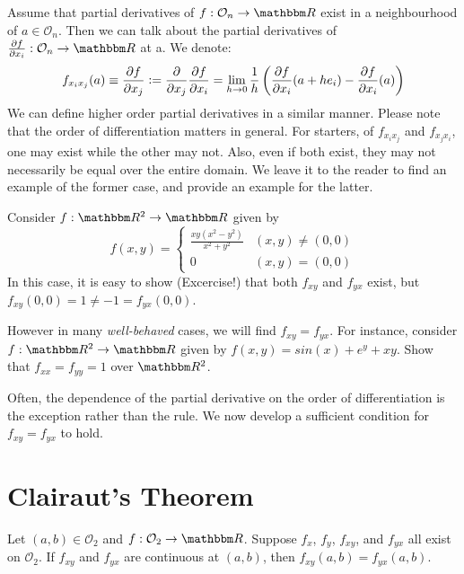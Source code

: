 \documentclass[../Analysis-3]{subfiles}
\begin{document}
Assume that partial derivatives of $f: \mathcal{O}_n \to \R$ exist in a neighbourhood of $a \in \mathcal{O}_n $. Then we can talk about the partial derivatives of $\pdv{f}{x_i}: \mathcal{O}_n \to \R$ at a. We denote:
\[f_{x_i x_j}(a) \equiv \pdv{f}{x_j} \mathrel{\mathop:}= \frac{\partial}{\partial x_j} \pdv{f}{x_i} = \lim_{h \to 0} \frac{1}{h} \left( \pdv{f}{x_i}\/(a+h e_i)- \pdv{f}{x_i}\/ (a) \right) 
\]
We can define higher order partial derivatives in a similar manner. Please note that the order of differentiation matters in general. For starters, of  $f_{x_i x_j}$ and $f_{x_j x_i}$, one may exist while the other may not. Also, even if both exist, they may not necessarily be equal over the entire domain. We leave it to the reader to find an example of the former case, and provide an example for the latter.

\begin{Eg}{}{}
    Consider $f: \R^2 \to \R$ given by 
    \[
        f(x,y) = 
        \begin{cases}
        \frac{xy(x^2 - y^2)}{x^2 + y^2} & (x,y) \neq (0,0)\\
        0 & (x,y) = (0,0)
        \end{cases}
    \]
    In this case, it is easy to show (Excercise!) that both $f_{xy}$ and $f_{yx}$ exist, but $f_{xy}(0,0) = 1 \neq -1 = f_{yx}(0,0)$.
\end{Eg}

\begin{Eg}{}{}
    However in many \emph{well-behaved} cases, we will find $f_{xy} = f_{yx}$.
    For instance, consider $f: \R^2 \to \R$ given by $f(x,y) = sin(x) + e^y + xy$. Show that $f_{xx} = f_{yy} = 1$ over $\R^2$.
\end{Eg}

Often, the dependence of the partial derivative on the order of differentiation is the exception rather than the rule. We now develop a sufficient condition for $f_{xy} = f_{yx}$ to hold.

\section{Clairaut's Theorem}

\begin{Thm}{}{}\label{thm1:19}
    Let $(a,b) \in \mathcal{O}_2$ and $f:\mathcal{O}_2 \to \R$. Suppose $f_x$, $f_y$, $f_{xy}$, and $f_{yx}$ all exist on $\mathcal{O}_2$. If $f_{xy}$ and $f_{yx}$ are continuous at $(a,b)$, then $f_{xy}(a,b) = f_{yx}(a,b)$.
\end{Thm}
\end{document}
